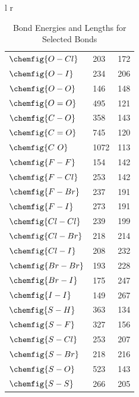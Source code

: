 \begin{table}[ht]
\begin{tabular}{l r }
\begin{tabular}{l l l }
            $\chemfig{O-Cl}$ & 203 & 172 \\
            $\chemfig{O-I}$ & 234 & 206 \\
            $\chemfig{O-O}$ & 146 & 148 \\
            $\chemfig{O=O}$ & 495 & 121 \\
            $\chemfig{C-O}$ & 358 & 143 \\
            $\chemfig{C=O}$ & 745\footnotemark & 120 \\
            $\chemfig{C~O}$ & 1072 & 113 \\
            $\chemfig{F-F}$ & 154 & 142 \\
            $\chemfig{F-Cl}$ & 253 & 142 \\
            $\chemfig{F-Br}$ & 237 & 191 \\
            $\chemfig{F-I}$ & 273 & 191 \\
            $\chemfig{Cl-Cl}$ & 239 & 199 \\
            $\chemfig{Cl-Br}$ & 218 & 214 \\
            $\chemfig{Cl-I}$ & 208 & 232 \\
            $\chemfig{Br-Br}$ & 193 & 228 \\
            $\chemfig{Br-I}$ & 175 & 247 \\
            $\chemfig{I-I}$ & 149 & 267 \\
            $\chemfig{S-H}$ & 363 & 134 \\
            $\chemfig{S-F}$ & 327 & 156 \\
            $\chemfig{S-Cl}$ & 253 & 207 \\
            $\chemfig{S-Br}$ & 218 & 216 \\
            $\chemfig{S-O}$ & 523 & 143 \\
            $\chemfig{S-S}$ & 266 & 205 \\
        \end{tabular}
    \end{tabular}
    \caption{Bond Energies and Lengths for Selected Bonds}
\end{table}
\clearpage
